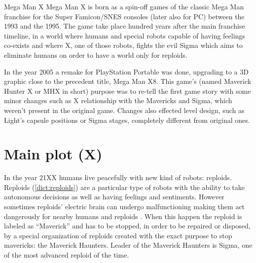 \documentclass[openany]{report}
\begin{document}
\begin{chapter}{Mega Man X}
	Mega Man X is born as a spin-off games of the classic Mega Man franchise for the Super Famicon/SNES consoles (later also for PC)  between the 1993 and the 1995\cite{wiki:MMX}. The game take place hundred years after the main franchise timeline, in a world where humans and special robots capable of having feelings co-exists and where X, one of those robots, fights the evil Sigma which aims to eliminate humans on order to have a world only for reploids.
	
	In the year 2005 a remake for PlayStation Portable was done, upgrading to a 3D graphic close to the precedent title, Mega Man X8. This game's (named Maverick Hunter X or MHX in short) purpose was to re-tell the first game story with some minor changes such as X relationship with the Mavericks and Sigma, which weren't present in the original game. Changes also effected level design, such as Light's capsule positions or Sigma stages, completely different from original ones.
	\section[Main plot]{Main plot (X)}
	In the year 21XX humans live peacefully with new kind of robots: reploids. Reploids (\ref{dict:reploids}) are a particular type of robots with the ability to take autonomous decisions as well as having feelings and sentiments\cite{Xcoll1:Manual_X1}. However sometimes reploids' electric brain can undergo  malfunctioning making them act dangerously for nearby humans and reploids . When this happen the reploid is labeled as ``Maverick'' and has to be stopped, in order to be repaired or disposed, by a special organization of reploids created with the exact purpose to stop mavericks: the Maverick Haunters. Leader of the Maverick Haunters is Sigma, one of the most advanced reploid of the time. 
		

\end{chapter}
\end{document}
